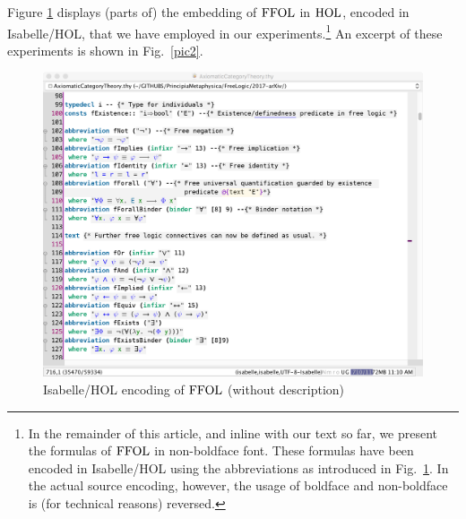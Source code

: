 Figure \ref{pic1} displays (parts of) the embedding of $\text{\textrm{FFOL}}$ in
$\text{\textrm{HOL}}$, encoded in Isabelle/HOL, that we have employed in our
experiments.\footnote{In the remainder of this article, and inline
  with our text so far,  we present the formulas of
  $\text{\textrm{FFOL}}$ in non-boldface font. These formulas have been encoded in Isabelle/HOL using the
  abbreviations as introduced in Fig.~\ref{pic1}. In the actual source
  encoding, however, the usage of boldface and non-boldface is
  (for technical reasons) reversed.} 
An excerpt of these experiments is shown in Fig.~\ref{pic2}.

\begin{figure}[htp]
 \includegraphics[width=\textwidth]{FFOL-Pic1}
 \caption{Isabelle/HOL encoding of $\text{\textrm{FFOL}}$ (without description)\label{pic1}}
\end{figure}


